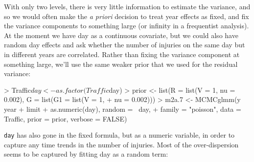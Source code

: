 \documentclass{article}
\begin{document}
With only two levels, there is very little information to estimate the variance, and so we would often make the \emph{a priori} decision to treat year effects as fixed, and fix the variance components to something large (or infinity in a frequentist analysis).\\

At the moment we have day as a continuous covariate, but we could also have random day effects and ask whether the number of injuries on the same day but in different years are correlated. Rather than fixing the variance component at something large, we'll use the same weaker prior that we used for the residual variance:

\begin{Schunk}
\begin{Sinput}
> Traffic$day <- as.factor(Traffic$day)
> prior <- list(R = list(V = 1, nu = 0.002), G = list(G1 = list(V = 1, 
+     nu = 0.002)))
> m2a.7 <- MCMCglmm(y ~ year + limit + as.numeric(day), random = ~day, 
+     family = "poisson", data = Traffic, prior = prior, verbose = FALSE)
\end{Sinput}
\end{Schunk}

\texttt{day} has also gone in the fixed formula, but as a numeric variable, in order to capture any time trends in the number of injuries. Most of the over-dispersion seems to be captured by fitting day as a random term:

\begin{Schunk}
\end{Schunk}
\end{document}
